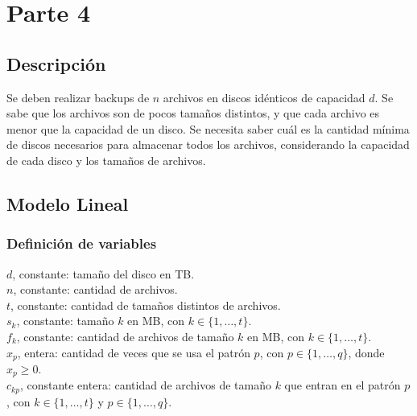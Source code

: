 \documentclass[11pt, a4paper, pdftex]{article}
\begin{document}
\newpage
\section{Parte 4}\label{cuarta:parte}

\subsection{Descripción}

Se deben realizar backups de $n$ archivos en discos idénticos de
capacidad $d$. Se sabe que los archivos son de pocos tamaños distintos,
y que cada archivo es menor que la capacidad de un disco. Se necesita
saber cuál es la cantidad mínima de discos necesarios para almacenar
todos los archivos, considerando la capacidad de cada disco y los
tamaños de archivos.

\subsection{Modelo Lineal}

\subsubsection{Definición de variables}

\noindent $d$, constante: tamaño del disco en TB. \\

\noindent $n$, constante: cantidad de archivos. \\


\noindent $t$, constante: cantidad de tamaños distintos de archivos. \\

\noindent $s_{k}$, constante: tamaño $k$ en MB, con $k \in \{1, \ldots, t\}$. \\

\noindent $f_{k}$, constante: cantidad de archivos de tamaño $k$ en MB, con $k \in \{1, \ldots, t\}$. \\

\noindent $x_{p}$, entera: cantidad de veces que se usa el patrón $p$, con $p \in \{1, \ldots, q\}$, donde $x_{p} \ge 0$. \\

\noindent $c_{kp}$, constante entera: cantidad de archivos de tamaño $k$ que entran en el patrón $p$, con $k \in \{1, \ldots, t\}$ y $p \in \{1, \ldots, q\}$.
\end{document}

